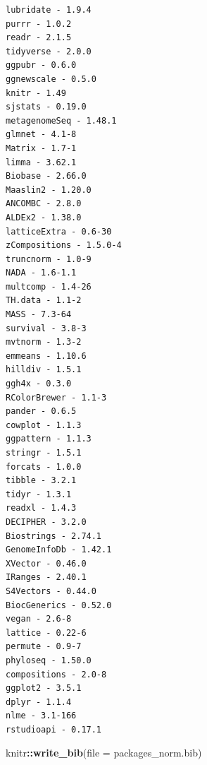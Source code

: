 \documentclass[
  11pt,
]{article}
\newenvironment{Shaded}{\begin{snugshade}}{\end{snugshade}}
\newcommand{\AttributeTok}[1]{\textcolor[rgb]{0.13,0.29,0.53}{#1}}
\newcommand{\FunctionTok}[1]{\textcolor[rgb]{0.13,0.29,0.53}{\textbf{#1}}}
\newcommand{\NormalTok}[1]{#1}
\newcommand{\SpecialCharTok}[1]{\textcolor[rgb]{0.81,0.36,0.00}{\textbf{#1}}}
\newcommand{\StringTok}[1]{\textcolor[rgb]{0.31,0.60,0.02}{#1}}
\begin{document}
\begin{verbatim}
lubridate - 1.9.4 
purrr - 1.0.2 
readr - 2.1.5 
tidyverse - 2.0.0 
ggpubr - 0.6.0 
ggnewscale - 0.5.0 
knitr - 1.49 
sjstats - 0.19.0 
metagenomeSeq - 1.48.1 
glmnet - 4.1-8 
Matrix - 1.7-1 
limma - 3.62.1 
Biobase - 2.66.0 
Maaslin2 - 1.20.0 
ANCOMBC - 2.8.0 
ALDEx2 - 1.38.0 
latticeExtra - 0.6-30 
zCompositions - 1.5.0-4 
truncnorm - 1.0-9 
NADA - 1.6-1.1 
multcomp - 1.4-26 
TH.data - 1.1-2 
MASS - 7.3-64 
survival - 3.8-3 
mvtnorm - 1.3-2 
emmeans - 1.10.6 
hilldiv - 1.5.1 
ggh4x - 0.3.0 
RColorBrewer - 1.1-3 
pander - 0.6.5 
cowplot - 1.1.3 
ggpattern - 1.1.3 
stringr - 1.5.1 
forcats - 1.0.0 
tibble - 3.2.1 
tidyr - 1.3.1 
readxl - 1.4.3 
DECIPHER - 3.2.0 
Biostrings - 2.74.1 
GenomeInfoDb - 1.42.1 
XVector - 0.46.0 
IRanges - 2.40.1 
S4Vectors - 0.44.0 
BiocGenerics - 0.52.0 
vegan - 2.6-8 
lattice - 0.22-6 
permute - 0.9-7 
phyloseq - 1.50.0 
compositions - 2.0-8 
ggplot2 - 3.5.1 
dplyr - 1.1.4 
nlme - 3.1-166 
rstudioapi - 0.17.1 
\end{verbatim}

\begin{Shaded}
\begin{Highlighting}[]
\NormalTok{knitr}\SpecialCharTok{::}\FunctionTok{write\_bib}\NormalTok{(}\AttributeTok{file =} \StringTok{\textquotesingle{}packages\_norm.bib\textquotesingle{}}\NormalTok{)}
\end{Highlighting}
\end{Shaded}
\end{document}
